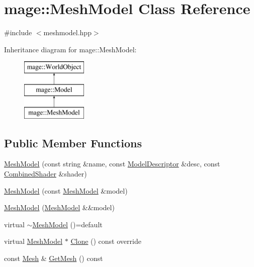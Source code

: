 \hypertarget{classmage_1_1_mesh_model}{}\section{mage\+:\+:Mesh\+Model Class Reference}
\label{classmage_1_1_mesh_model}


{\ttfamily \#include $<$meshmodel.\+hpp$>$}

Inheritance diagram for mage\+:\+:Mesh\+Model\+:\begin{figure}[H]
\begin{center}
\leavevmode
\includegraphics[height=3.000000cm]{classmage_1_1_mesh_model}
\end{center}
\end{figure}
\subsection*{Public Member Functions}
\begin{DoxyCompactItemize}
\item 
\hyperlink{classmage_1_1_mesh_model_a95d70993b56b1a649797880583daf3db}{Mesh\+Model} (const string \&name, const \hyperlink{classmage_1_1_model_descriptor}{Model\+Descriptor} \&desc, const \hyperlink{structmage_1_1_combined_shader}{Combined\+Shader} \&shader)
\item 
\hyperlink{classmage_1_1_mesh_model_a74d2443e5d4b0f66ef981ad1312e4987}{Mesh\+Model} (const \hyperlink{classmage_1_1_mesh_model}{Mesh\+Model} \&model)
\item 
\hyperlink{classmage_1_1_mesh_model_afd5dc4033fe3d1277e4d2756b0de2c04}{Mesh\+Model} (\hyperlink{classmage_1_1_mesh_model}{Mesh\+Model} \&\&model)
\item 
virtual \hyperlink{classmage_1_1_mesh_model_a5e918737b966842a31381ef6c00ca6d2}{$\sim$\+Mesh\+Model} ()=default
\item 
virtual \hyperlink{classmage_1_1_mesh_model}{Mesh\+Model} $\ast$ \hyperlink{classmage_1_1_mesh_model_a7130eca9a1dac038c33b838c15138161}{Clone} () const override
\item 
const \hyperlink{classmage_1_1_mesh}{Mesh} \& \hyperlink{classmage_1_1_mesh_model_ab9a1c64ebb6b72cd6862e701983351c4}{Get\+Mesh} () const
\end{DoxyCompactItemize}
